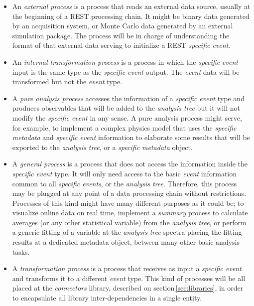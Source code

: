 \begin{itemize}
\item An \emph{external process} is a process that reads an external data source, usually at the beginning of a REST processing chain. It might be binary data generated by an acquisition system, or Monte Carlo data generated by an external simulation package. The process will be in charge of understanding the format of that external data serving to initialize a REST \emph{specific event}.

\item An \emph{internal transformation process} is a process in which the \emph{specific event} input is the same type as the \emph{specific event} output. The \emph{event} data will be transformed but not the \emph{event} type.

\item A \emph{pure analysis process} accesses the information of a \emph{specific event} type and produces observables that will be added to the \emph{analysis tree} but it will not modify the \emph{specific event} in any sense. A pure analysis process might serve, for example, to implement a complex physics model that uses the \emph{specific metadata} and \emph{specific event} information to elaborate some results that will be exported to the \emph{analysis tree}, or a \emph{specific metadata} object.

\item A \emph{general process} is a process that does not access the information inside the \emph{specific event} type. It will only need access to the basic \emph{event} information common to all \emph{specific events}, or the \emph{analysis tree}. Therefore, this process may be plugged at any point of a data processing chain without restrictions. Processes of this kind might have many different purposes as it could be; to visualize online data on real time, implement a \emph{summary} process to calculate averages (or any other statistical variable) from the \emph{analysis tree}, or perform a generic fitting of a variable at the \emph{analysis tree} spectra placing the fitting results at a dedicated metadata object, between many other basic analysis tasks.

\item A \emph{transformation process} is a process that receives as input a \emph{specific event} and transforms it to a different \emph{event} type. This kind of processes will be all placed at the \emph{connectors} library, described on section\,\ref{sec:libraries}, in order to encapsulate all library inter-dependencies in a single entity. 
\end{itemize}

